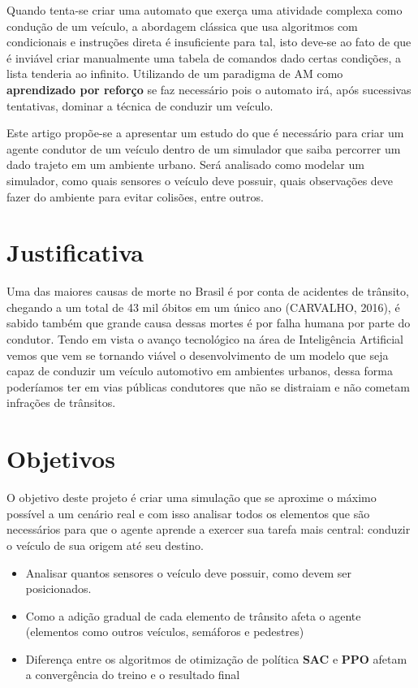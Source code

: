 Quando tenta-se criar uma automato que exerça uma atividade complexa como condução de um veículo, a abordagem clássica que usa algoritmos com condicionais e instruções direta é insuficiente para tal, isto deve-se ao fato de que é inviável criar manualmente uma tabela de comandos dado certas condições, a lista tenderia ao infinito. Utilizando de um paradigma de AM como \textbf{aprendizado por reforço} se faz necessário pois o automato irá, após sucessivas tentativas, dominar a técnica de conduzir um veículo.

\begin{comment}
    Introduzir brevemente o PPO e SAC aqui
\end{comment}

Este artigo propõe-se a apresentar um estudo do que é necessário para criar um agente condutor de um veículo dentro de um simulador que saiba percorrer um dado trajeto em um ambiente urbano. Será analisado como modelar um simulador, como quais sensores o veículo deve possuir, quais observações deve fazer do ambiente para evitar colisões, entre outros.


\section*{Justificativa}\label{sec:justificativa}
Uma das maiores causas de morte no Brasil é por conta de acidentes de trânsito, chegando a um total de 43 mil óbitos em um único ano (CARVALHO, 2016), é sabido também que grande causa dessas mortes é por falha humana por parte do condutor. Tendo em vista o avanço tecnológico na área de Inteligência Artificial vemos que vem se tornando viável o desenvolvimento de um modelo que seja capaz de conduzir um veículo automotivo em ambientes urbanos, dessa forma poderíamos ter em vias públicas condutores que não se distraiam e não cometam infrações de trânsitos.


\section*{Objetivos}\label{sec:objetivos}
O objetivo deste projeto é criar uma simulação que se aproxime o máximo possível a um cenário real e com isso analisar todos os elementos que são necessários para que o agente aprende a exercer sua tarefa mais central: conduzir o veículo de sua origem até seu destino.
\begin{itemize}
    \item Analisar quantos sensores o veículo deve possuir, como devem ser posicionados. 
    \item Como a adição gradual de cada elemento de trânsito afeta o agente (elementos como outros veículos, semáforos e pedestres)
    \item Diferença entre os algoritmos de otimização de política \textbf{SAC} e \textbf{PPO} afetam a convergência do treino e o resultado final
\end{itemize}

